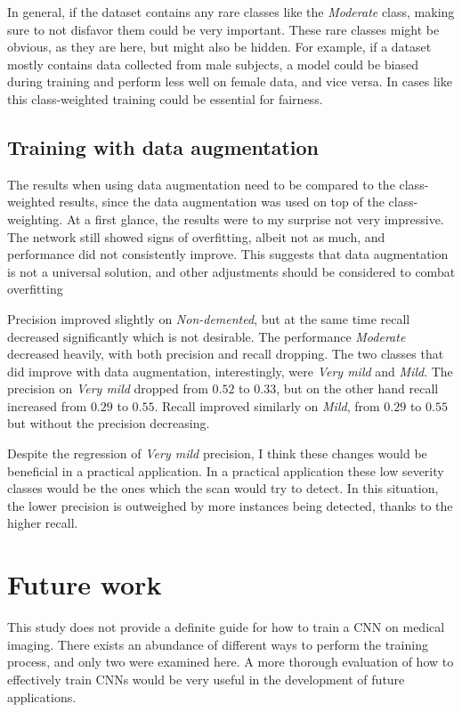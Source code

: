 \documentclass{kththesis}
\begin{document}
In general, if the dataset contains any rare classes like the \textit{Moderate} class, making sure to not disfavor them could be very important. These rare classes might be obvious, as they are here, but might also be hidden. For example, if a dataset mostly contains data collected from male subjects, a model could be biased during training and perform less well on female data, and vice versa. In cases like this class-weighted training could be essential for fairness.

\subsection{Training with data augmentation}
The results when using data augmentation need to be compared to the class-weighted results, since the data augmentation was used on top of the class-weighting. At a first glance, the results were to my surprise not very impressive. The network still showed signs of overfitting, albeit not as much, and performance did not consistently improve. This suggests that data augmentation is not a universal solution, and other adjustments should be considered to combat overfitting

Precision improved slightly on \textit{Non-demented}, but at the same time recall decreased significantly which is not desirable. The performance \textit{Moderate} decreased heavily, with both precision and recall dropping. The two classes that did improve with data augmentation, interestingly, were \textit{Very mild} and \textit{Mild}. The precision on \textit{Very mild} dropped from $0.52$ to $0.33$, but on the other hand recall increased from $0.29$ to $0.55$. Recall improved similarly on \textit{Mild}, from $0.29$ to $0.55$ but without the precision decreasing.

Despite the regression of \textit{Very mild} precision, I think these changes would be beneficial in a practical application. In a practical application these low severity classes would be the ones which the scan would try to detect. In this situation, the lower precision is outweighed by more instances being detected, thanks to the higher recall.

\section{Future work}
This study does not provide a definite guide for how to train a CNN on medical imaging. There exists an abundance of different ways to perform the training process, and only two were examined here. A more thorough evaluation of how to effectively train CNNs would be very useful in the development of future applications.
\end{document}
